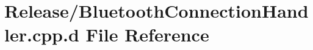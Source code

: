\hypertarget{_release_2_bluetooth_connection_handler_8cpp_8d}{\section{\-Release/\-Bluetooth\-Connection\-Handler.cpp.\-d \-File \-Reference}
\label{_release_2_bluetooth_connection_handler_8cpp_8d}
}
